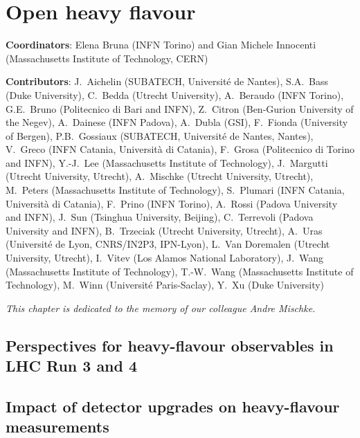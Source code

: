 \documentclass[../report.tex]{subfiles}
\providecommand{\main}{..}
\begin{document}
\clearpage
\section{Open heavy flavour}
\label{sec:HI_HF}

{ \small
\noindent 
\textbf{Coordinators}: Elena Bruna (INFN Torino) and Gian Michele Innocenti (Massachusetts Institute of Technology, CERN)

\noindent \textbf{Contributors}: 
J.~Aichelin (SUBATECH, Universit\'e de Nantes),
S.A.~Bass (Duke University),
C.~Bedda (Utrecht University),
A.~Beraudo (INFN Torino),
G.E.~Bruno (Politecnico di Bari and INFN), 
Z.~Citron (Ben-Gurion University of the Negev),
A.~Dainese (INFN Padova),
A.~Dubla (GSI),
F.~Fionda (University of Bergen),
P.B.~Gossiaux (SUBATECH, Universit\'e de Nantes, Nantes),
V.~Greco (INFN Catania, Universit\`a di Catania),
F.~Grosa (Politecnico di Torino and INFN),
Y.-J.~Lee (Massachusetts Institute of Technology),
J.~Margutti (Utrecht University, Utrecht),
A.~Mischke (Utrecht University, Utrecht),
M.~Peters (Massachusetts Institute of Technology),
S.~Plumari (INFN Catania, Universit\`a di Catania),
F.~Prino (INFN Torino),
A.~Rossi (Padova University and INFN),
J.~Sun (Tsinghua University, Beijing),
C.~Terrevoli (Padova University and INFN),
B.~Trzeciak (Utrecht University, Utrecht),
A.~Uras (Universit{\'e} de Lyon, CNRS/IN2P3, IPN-Lyon),
L.~Van Doremalen (Utrecht University, Utrecht),
I.~Vitev (Los Alamos National Laboratory),
J.~Wang (Massachusetts Institute of Technology),
T.-W.~Wang (Massachusetts Institute of Technology),
M.~Winn (Universit\'e Paris-Saclay),
Y.~Xu (Duke University)
}

\vspace{3mm}
\begin{center}
{\em This chapter is dedicated to the memory of our colleague Andre Mischke.}
\end{center}


\subsection{Perspectives for heavy-flavour observables in LHC Run 3 and 4}


\subsection{Impact of detector upgrades on heavy-flavour measurements}

\end{document}
